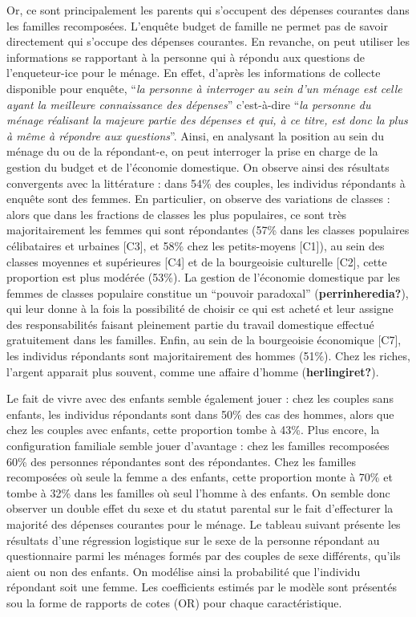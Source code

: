 \documentclass[
  12pt,
]{book}
\begin{document}
Or, ce sont principalement les parents qui s'occupent des dépenses
courantes dans les familles recomposées. L'enquête budget de famille ne
permet pas de savoir directement qui s'occupe des dépenses courantes. En
revanche, on peut utiliser les informations se rapportant à la personne
qui à répondu aux questions de l'enqueteur-ice pour le ménage. En effet,
d'après les informations de collecte disponible pour enquête, ``\emph{la
personne à interroger au sein d'un ménage est celle ayant la meilleure
connaissance des dépenses}'' c'est-à-dire ``\emph{la personne du ménage
réalisant la majeure partie des dépenses et qui, à ce titre, est donc la
plus à même à répondre aux questions}''. Ainsi, en analysant la position
au sein du ménage du ou de la répondant-e, on peut interroger la prise
en charge de la gestion du budget et de l'économie domestique. On
observe ainsi des résultats convergents avec la littérature : dans 54\%
des couples, les individus répondants à enquête sont des femmes. En
particulier, on observe des variations de classes : alors que dans les
fractions de classes les plus populaires, ce sont très majoritairement
les femmes qui sont répondantes (57\% dans les classes populaires
célibataires et urbaines {[}C3{]}, et 58\% chez les petits-moyens
{[}C1{]}), au sein des classes moyennes et supérieures {[}C4{]} et de la
bourgeoisie culturelle {[}C2{]}, cette proportion est plus modérée
(53\%). La gestion de l'économie domestique par les femmes de classes
populaire constitue un ``pouvoir paradoxal'' (\textbf{perrinheredia?}),
qui leur donne à la fois la possibilité de choisir ce qui est acheté et
leur assigne des responsabilités faisant pleinement partie du travail
domestique effectué gratuitement dans les familles. Enfin, au sein de la
bourgeoisie économique {[}C7{]}, les individus répondants sont
majoritairement des hommes (51\%). Chez les riches, l'argent apparait
plus souvent, comme une affaire d'homme (\textbf{herlingiret?}).

Le fait de vivre avec des enfants semble également jouer : chez les
couples sans enfants, les individus répondants sont dans 50\% des cas
des hommes, alors que chez les couples avec enfants, cette proportion
tombe à 43\%. Plus encore, la configuration familiale semble jouer
d'avantage : chez les familles recomposées 60\% des personnes
répondantes sont des répondantes. Chez les familles recomposées où seule
la femme a des enfants, cette proportion monte à 70\% et tombe à 32\%
dans les familles où seul l'homme à des enfants. On semble donc observer
un double effet du sexe et du statut parental sur le fait d'effecturer
la majorité des dépenses courantes pour le ménage. Le tableau suivant
présente les résultats d'une régression logistique sur le sexe de la
personne répondant au questionnaire parmi les ménages formés par des
couples de sexe différents, qu'ils aient ou non des enfants. On modélise
ainsi la probabilité que l'individu répondant soit une femme. Les
coefficients estimés par le modèle sont présentés sou la forme de
rapports de cotes (OR) pour chaque caractéristique.
\end{document}
